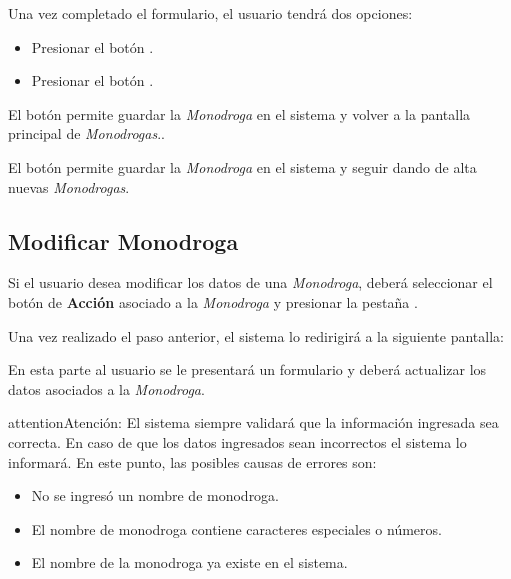 \documentclass[a4paper,10pt,spanish]{sphinxmanual}
\begin{document}
Una vez completado el formulario, el usuario tendrá dos opciones:
\begin{itemize}
\item {} 
Presionar el botón .

\item {} 
Presionar el botón .

\end{itemize}

El botón  permite guardar la \emph{Monodroga} en el sistema y volver a la pantalla
principal de \emph{Monodrogas}..

El botón  permite guardar la \emph{Monodroga} en el sistema y seguir dando de alta nuevas \emph{Monodrogas}.


\subsection{Modificar Monodroga}
\label{monodrogas:modificar-monodroga}\label{monodrogas:id2}
Si el usuario desea modificar los datos de una \emph{Monodroga}, deberá seleccionar el botón de \textbf{Acción} asociado a la \emph{Monodroga} y presionar la pestaña .


Una vez realizado el paso anterior, el sistema lo redirigirá a la siguiente pantalla:


En esta parte al usuario se le presentará un formulario y deberá actualizar los datos asociados a la \emph{Monodroga}.

\begin{notice}{attention}{Atención:}
El sistema siempre validará que la información ingresada sea correcta. En caso de que los datos ingresados sean incorrectos el sistema lo informará.
En este punto, las posibles causas de errores son:
\begin{itemize}
\item {} 
No se ingresó un nombre de monodroga.

\item {} 
El nombre de monodroga contiene caracteres especiales o números.

\item {} 
El nombre de la monodroga ya existe en el sistema.

\end{itemize}
\end{notice}
\end{document}
